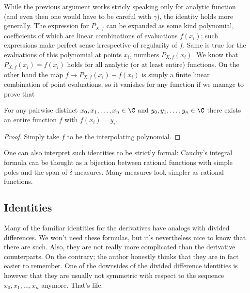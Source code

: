 While the previous argument works stricly speaking only for analytic function (and even then one would have to be careful with $\gamma$), the identity holds more generally. The expression for $P_{X, f}$ can be expanded as some kind polynomial, coefficients of which are linear combinations of evaluations $f(x_{i})$: such expressions make perfect sense irrespective of regularity of $f$. Same is true for the evaluations of this polynomial at points $x_{i}$, numbers $P_{X, f}(x_{i})$. We know that $P_{X, f}(x_{i}) = f(x_{i})$ holds for all analytic (or at least entire) functions. On the other hand the map $f \mapsto P_{X, f}(x_{i}) - f(x_{i})$ is simply a finite linear combination of point evaluations, so it vanishes for any function if we manage to prove that

\begin{lem}\label{entire_interpolation}
	For any pairwise distinct $x_{0}, x_{1}, \ldots, x_{n} \in \C$ and $y_{0}, y_{1}, \ldots, y_{n} \in \C$ there exists an entire function $f$ with $f(x_{i}) = y_{i}$.
\end{lem}
\begin{proof}
	Simply take $f$ to be the interpolating polynomial.
\end{proof}

One can also interpret such identities to be strictly formal: Cauchy's integral formula can be thought as a bijection between rational functions with simple poles and the span of $\delta$-measures. Many measures look simpler as rational functions.

\subsection{Identities}

Many of the familiar identities for the derivatives have analogs with divided differences. We won't need these formulas, but it's nevertheless nice to know that there are such. Also, they are not really more complicated than the derivative counterparts. On the contrary; the author honestly thinks that they are in fact easier to remember. One of the downsides of the divided difference identities is however that they are usually not symmetric with respect to the sequence $x_{0}, x_{1}, \ldots, x_{n}$ anymore. That's life.


